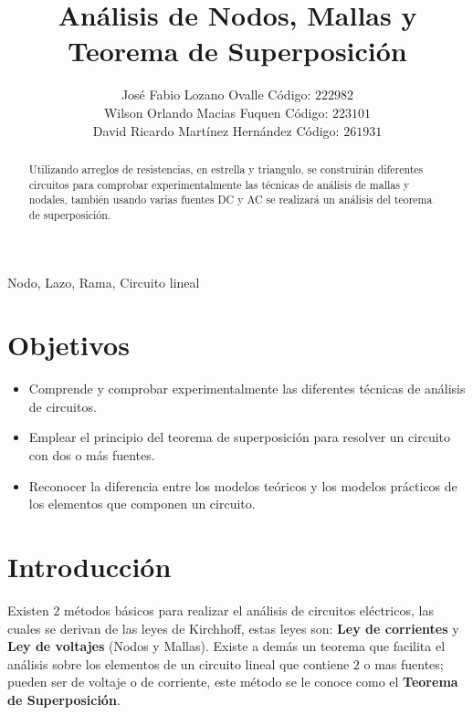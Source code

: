 \documentclass[twocolumn]{IEEEtran}
\begin{document}
\title{Análisis de Nodos, Mallas y Teorema de Superposición}
\author{José Fabio Lozano Ovalle Código: $222982$\\
	Wilson Orlando Macias Fuquen Código: $223101$\\
	David Ricardo Martínez Hernández Código: $261931$}
\maketitle
{}

\begin{abstract}
Utilizando arreglos de resistencias, en estrella y triangulo, se construirán diferentes  circuitos para comprobar experimentalmente las técnicas de análisis de mallas y nodales, también usando  varias fuentes DC y AC se realizará un análisis del teorema de superposición.
\end{abstract}

\begin{keywords}
Nodo, Lazo, Rama, Circuito lineal
\end{keywords}

\section{Objetivos}
\begin{itemize}
 \item Comprende y comprobar experimentalmente las diferentes técnicas de análisis de circuitos.
 \item Emplear el principio del teorema de superposición para resolver un circuito con dos o más fuentes.
 \item Reconocer la diferencia entre los modelos teóricos y los modelos prácticos de los elementos que componen un circuito.
\end{itemize}

\section{Introducción}
\noindent
Existen $2$ métodos básicos para realizar el análisis de circuitos eléctricos, las cuales se derivan de las leyes de Kirchhoff, estas leyes son: \textbf{Ley de corrientes} y \textbf{Ley de voltajes} (Nodos y Mallas). Existe a demás un teorema que facilita el análisis sobre los elementos de un circuito lineal que contiene $2$ o mas fuentes; pueden ser de voltaje o de corriente, este método se le conoce como el \textbf{Teorema de Superposición}.
\end{document}
